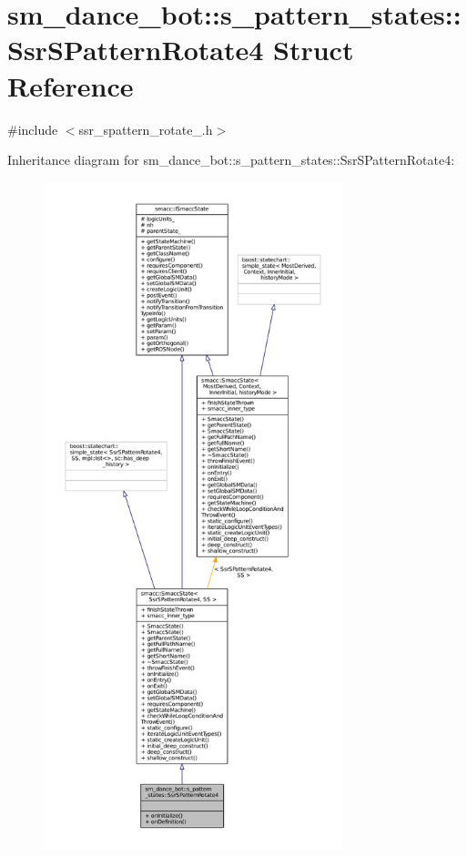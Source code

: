 \hypertarget{structsm__dance__bot_1_1s__pattern__states_1_1SsrSPatternRotate4}{}\section{sm\+\_\+dance\+\_\+bot\+:\+:s\+\_\+pattern\+\_\+states\+:\+:Ssr\+S\+Pattern\+Rotate4 Struct Reference}
\label{structsm__dance__bot_1_1s__pattern__states_1_1SsrSPatternRotate4}


{\ttfamily \#include $<$ssr\+\_\+spattern\+\_\+rotate\+\_.\+h$>$}



Inheritance diagram for sm\+\_\+dance\+\_\+bot\+:\+:s\+\_\+pattern\+\_\+states\+:\+:Ssr\+S\+Pattern\+Rotate4\+:
\nopagebreak
\begin{figure}[H]
\begin{center}
\leavevmode
\includegraphics[height=550pt]{structsm__dance__bot_1_1s__pattern__states_1_1SsrSPatternRotate4__inherit__graph}
\end{center}
\end{figure}


